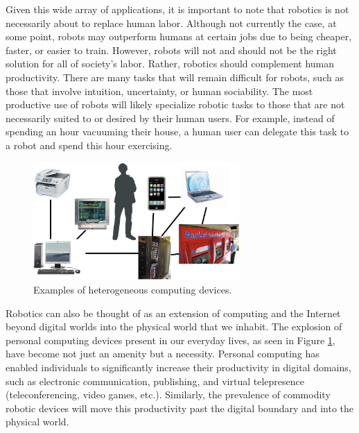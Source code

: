 Given this wide array of applications, it is important to note that robotics is not necessarily about to replace human labor.  Although not currently the case, at some point, robots may outperform humans at certain jobs due to being cheaper, faster, or easier to train.  However, robots will not and should not be the right solution for all of society's labor.  Rather, robotics should complement human productivity. There are many tasks that will remain difficult for robots, such as those that involve intuition, uncertainty, or human sociability.  The most productive use of robots will likely specialize robotic tasks to those that are not necessarily suited to or desired by their human users.  For example, instead of spending an hour vacuuming their house, a human user can delegate this task to a robot and spend this hour exercising.

\begin{figure}[!h]
\centering
\includegraphics[width=0.7\textwidth]{figures/1_personal_computing.jpg}
\caption{Examples of heterogeneous computing devices.}
\label{fig:1_personal_computing}
\end{figure}


Robotics can also be thought of as an extension of computing and the Internet beyond digital worlds into the physical world that we inhabit. The explosion of personal computing devices present in our everyday lives, as seen in Figure \ref{fig:1_personal_computing}, have become not just an amenity but a necessity. Personal computing has enabled individuals to significantly increase their productivity in digital domains, such as electronic communication, publishing, and virtual telepresence (teleconferencing, video games, etc.).  Similarly, the prevalence of commodity robotic devices will move this productivity past the digital boundary and into the physical world. 

